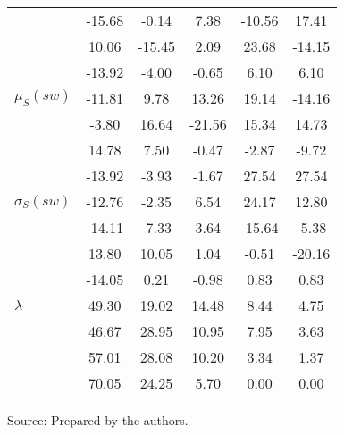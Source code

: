 \begin{table}[h!]
\begin{center}
\begin{tabular}{| l || c | c | c | c | c |}
 & -15.68  & -0.14  & 7.38  & -10.56  & 17.41 \\
 & 10.06  & -15.45  & 2.09  & 23.68  & -14.15 \\
 & -13.92  & -4.00  & -0.65  & 6.10  & 6.10 \\\hline
$\mu_S(sw)$ & -11.81  & 9.78  & 13.26  & 19.14  & -14.16 \\
 & -3.80  & 16.64  & -21.56  & 15.34  & 14.73 \\
 & 14.78  & 7.50  & -0.47  & -2.87  & -9.72 \\
 & -13.92  & -3.93  & -1.67  & 27.54  & 27.54 \\\hline
$\sigma_S(sw)$ & -12.76  & -2.35  & 6.54  & 24.17  & 12.80 \\
 & -14.11  & -7.33  & 3.64  & -15.64  & -5.38 \\
 & 13.80  & 10.05  & 1.04  & -0.51  & -20.16 \\
 & -14.05  & 0.21  & -0.98  & 0.83  & 0.83 \\\hline\hline
$\lambda$ & 49.30  & 19.02  & 14.48  & 8.44  & 4.75 \\
 & 46.67  & 28.95  & 10.95  & 7.95  & 3.63 \\
 & 57.01  & 28.08  & 10.20  & 3.34  & 1.37 \\
 & 70.05  & 24.25  & 5.70  & 0.00  & 0.00 \\\hline
\end{tabular}
\begin{flushleft}
		Source: Prepared by the authors.\
\end{flushleft}
\end{center}
\end{table}
